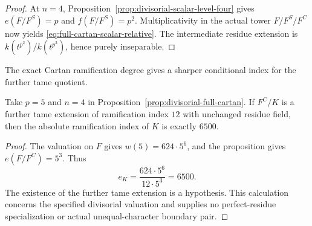 \begin{proof}
At $n=4$, Proposition~\ref{prop:divisorial-scalar-level-four} gives $e(F/F^S)=p$ and $f(F/F^S)=p^2$. Multiplicativity in the actual tower $F/F^S/F^C$ now yields \eqref{eq:full-cartan-scalar-relative}. The intermediate residue extension is $k(t^{p^2})/k(t^{p^3})$, hence purely inseparable.
\end{proof}

The exact Cartan ramification degree gives a sharper conditional index for the further tame quotient.
\begin{corollary}\label{cor:divisorial-full-cartan-6500}
Take $p=5$ and $n=4$ in Proposition~\ref{prop:divisorial-full-cartan}. If $F^C/K$ is a further tame extension of ramification index $12$ with unchanged residue field, then the absolute ramification index of $K$ is exactly $6500$.
\end{corollary}
\begin{proof}
The valuation on $F$ gives $w(5)=624\cdot5^6$, and the proposition gives $e(F/F^C)=5^3$. Thus
\[
 e_K=\frac{624\cdot5^6}{12\cdot5^3}=6500.
\]
The existence of the further tame extension is a hypothesis. This calculation concerns the specified divisorial valuation and supplies no perfect-residue specialization or actual unequal-character boundary pair.
\end{proof}
